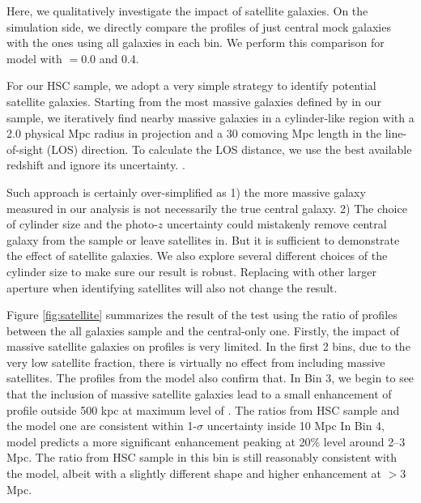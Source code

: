 \documentclass[a4paper,fleqn,usenatbib]{mnras}
\begin{document}
 

       Here, we qualitatively investigate the impact of satellite galaxies.
            On the simulation side, we directly compare the \dsigma{} profiles of just central
            mock galaxies with the ones using all galaxies in each bin.
            We perform this comparison for model with \sigmh{}$=0.0$ and 0.4.

        For our HSC sample, we adopt a very simple strategy to identify potential
            satellite galaxies.
            Starting from the most massive galaxies defined by \mmax{} in our sample,
            we iteratively find nearby massive galaxies in a cylinder-like region with
            a 2.0 physical Mpc radius in projection and a 30 comoving Mpc length in the
            line-of-sight (LOS) direction.
            To calculate the LOS distance, we use the best available redshift and ignore
            its uncertainty.
            .

       Such approach is certainly over-simplified as 1) the more massive galaxy
            measured in our analysis is not necessarily the true central galaxy.
            2) The choice of cylinder size and the photo-$z$ uncertainty could mistakenly
            remove central galaxy from the sample or leave satellites in.
            But it is sufficient to demonstrate the effect of satellite galaxies.
            We also explore several different choices of the cylinder size to make sure
            our result is robust.
            Replacing \mmax{} with other larger aperture \mstar{} when identifying satellites
            will also not change the result.

      Figure \ref{fig:satellite} summarizes the result of the test using the ratio
            of \dsigma{} profiles between the all galaxies sample and the central-only one.
            Firstly, the impact of massive satellite galaxies on \dsigma{} profiles is very limited.
            In the first 2 bins, due to the very low satellite fraction, there is virtually no
            effect from including massive satellites.
            The \dsigma{} profiles from the model also confirm that.
            In Bin 3, we begin to see that the inclusion of massive satellite galaxies
            lead to a small enhancement of \dsigma{} profile outside 500 kpc at maximum level
            of . The ratios from HSC sample and the  model one are consistent
            within 1-$\sigma$ uncertainty inside 10 Mpc
            In Bin 4,  model predicts a more significant enhancement peaking at
            20\% level around 2--3 Mpc.
            The ratio from HSC sample in this bin is still reasonably consistent with the model,
            albeit with a slightly different shape and higher enhancement at $>3$ Mpc.
\end{document}
